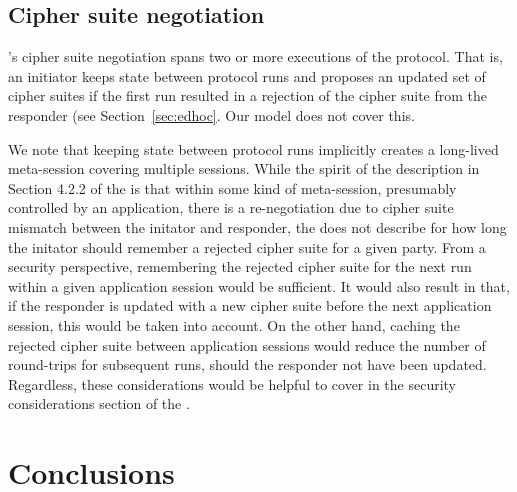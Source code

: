 \documentclass[runningheads,draft,x11names]{llncs}
\begin{document}
\subsection{Cipher suite negotiation}
\label{sec:ciphersuiteNegotiation}
%
\mEdhoc{}'s cipher suite negotiation spans two or more executions of the protocol.
%
That is, an initiator keeps state between protocol runs and proposes an updated
set of cipher suites if the first run resulted in a rejection of the
cipher suite from the responder (see Section~\ref{sec:edhoc}.
%
Our model does not cover this.
%

We note that keeping state between protocol runs implicitly creates a long-lived
meta-session covering multiple \mEdhoc{} sessions.
%
While the spirit of the description in Section 4.2.2 of the \mSpec{} is that
within some kind of meta-session, presumably controlled by an application,
there is a re-negotiation due to
cipher suite mismatch between the initator and responder, the \mSpec{} does not
describe for how long the initator should remember a rejected cipher suite for a
given party.
%
From a security perspective, remembering the rejected cipher suite for the
next \mEdhoc{} run within a given application session would be sufficient.
%
It would also result in that, if the responder is updated with a new cipher
suite before the next application session, this would be taken into account.
%
On the other hand, caching the rejected cipher suite between application
sessions would reduce the number of round-trips for subsequent runs, should
the responder not have been updated.
%
Regardless, these considerations would be helpful to cover in the security
considerations section of the \mSpec{}.
%

\section{Conclusions}
\label{sec:conclusions}

\end{document}
